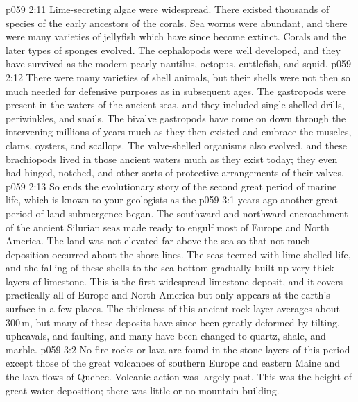 \vs p059 2:11 Lime\hyp{}secreting algae were widespread. There existed thousands of species of the early ancestors of the corals. Sea worms were abundant, and there were many varieties of jellyfish which have since become extinct. Corals and the later types of sponges evolved. The cephalopods were well developed, and they have survived as the modern pearly nautilus, octopus, cuttlefish, and squid.
\vs p059 2:12 There were many varieties of shell animals, but their shells were not then so much needed for defensive purposes as in subsequent ages. The gastropods were present in the waters of the ancient seas, and they included single\hyp{}shelled drills, periwinkles, and snails. The bivalve gastropods have come on down through the intervening millions of years much as they then existed and embrace the muscles, clams, oysters, and scallops. The valve\hyp{}shelled organisms also evolved, and these brachiopods lived in those ancient waters much as they exist today; they even had hinged, notched, and other sorts of protective arrangements of their valves.
\vs p059 2:13 \pc So ends the evolutionary story of the second great period of marine life, which is known to your geologists as the 
\vs p059 3:1  years ago another great period of land submergence began. The southward and northward encroachment of the ancient Silurian seas made ready to engulf most of Europe and North America. The land was not elevated far above the sea so that not much deposition occurred about the shore lines. The seas teemed with lime\hyp{}shelled life, and the falling of these shells to the sea bottom gradually built up very thick layers of limestone. This is the first widespread limestone deposit, and it covers practically all of Europe and North America but only appears at the earth’s surface in a few places. The thickness of this ancient rock layer averages about 300\,m, but many of these deposits have since been greatly deformed by tilting, upheavals, and faulting, and many have been changed to quartz, shale, and marble.
\vs p059 3:2 No fire rocks or lava are found in the stone layers of this period except those of the great volcanoes of southern Europe and eastern Maine and the lava flows of Quebec. Volcanic action was largely past. This was the height of great water deposition; there was little or no mountain building.
